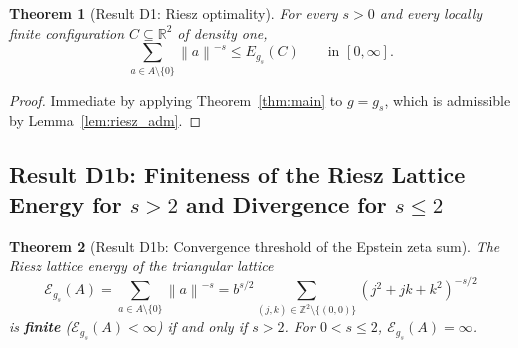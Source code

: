 \documentclass[11pt, a4paper]{article}
\newtheorem{theorem}{Theorem}[section]
\theoremstyle{definition}
\theoremstyle{remark}
\newcommand{\R}{\mathbb{R}}
\newcommand{\Z}{\mathbb{Z}}
\newcommand{\Ecal}{\mathcal{E}}
\newcommand{\norm}[1]{\left\lVert #1 \right\rVert}
\begin{document}
\begin{theorem}[Result D1: Riesz optimality]
For every $s > 0$ and every locally finite configuration $C \subseteq \R^2$ of density one,
\[
\sum_{a \in A \setminus \{0\}} \norm{a}^{-s} \le E_{g_s}(C) \qquad \text{in } [0, \infty].
\]
\end{theorem}

\begin{proof}
Immediate by applying Theorem~\ref{thm:main} to $g = g_s$, which is admissible by Lemma~\ref{lem:riesz_adm}.
\end{proof}

\subsection{Result D1b: Finiteness of the Riesz Lattice Energy for $s > 2$ and Divergence for $s \le 2$}

\begin{theorem}[Result D1b: Convergence threshold of the Epstein zeta sum]
\label{thm:riesz_finite}
The Riesz lattice energy of the triangular lattice
\[
\Ecal_{g_s}(A) = \sum_{a \in A \setminus \{0\}} \norm{a}^{-s} = b^{s/2} \sum_{(j, k) \in \Z^2 \setminus \{(0,0)\}} \left(j^2 + j k + k^2\right)^{-s/2}
\]
is \textbf{finite} ($\Ecal_{g_s}(A) < \infty$) if and only if $s > 2$. For $0 < s \le 2$, $\Ecal_{g_s}(A) = \infty$.
\end{theorem}
\end{document}

